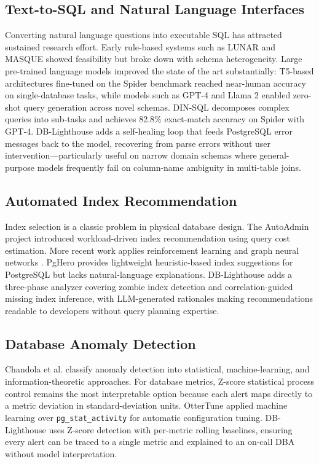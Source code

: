\documentclass[conference]{IEEEtran}
\begin{document}
\subsection{Text-to-SQL and Natural Language Interfaces}

Converting natural language questions into executable SQL has attracted
sustained research effort. Early rule-based systems such as LUNAR
\cite{woods1973progress} and MASQUE \cite{androutsopoulos1995nldb} showed
feasibility but broke down with schema heterogeneity. Large pre-trained
language models improved the state of the art substantially: T5-based
architectures fine-tuned on the Spider benchmark \cite{yu2018spider}
reached near-human accuracy on single-database tasks, while models such
as GPT-4 \cite{openai2023gpt4} and Llama 2 \cite{touvron2023llama} enabled
zero-shot query generation across novel schemas. DIN-SQL \cite{pourreza2024din}
decomposes complex queries into sub-tasks and achieves 82.8\% exact-match
accuracy on Spider with GPT-4. DB-Lighthouse adds a self-healing loop that
feeds PostgreSQL error messages back to the model, recovering from parse
errors without user intervention---particularly useful on narrow domain
schemas where general-purpose models frequently fail on column-name
ambiguity in multi-table joins.

\subsection{Automated Index Recommendation}

Index selection is a classic problem in physical database design. The
AutoAdmin project \cite{chaudhuri1997autoadmin} introduced workload-driven
index recommendation using query cost estimation. More recent work applies
reinforcement learning and graph neural networks \cite{lan2020index,
basu2020weightedge}. PgHero \cite{pghero2022} provides lightweight
heuristic-based index suggestions for PostgreSQL but lacks natural-language
explanations. DB-Lighthouse adds a three-phase analyzer covering zombie
index detection and correlation-guided missing index inference, with
LLM-generated rationales making recommendations readable to developers
without query planning expertise.

\subsection{Database Anomaly Detection}

Chandola et al. \cite{chandola2009anomaly} classify anomaly detection into
statistical, machine-learning, and information-theoretic approaches. For
database metrics, Z-score statistical process control \cite{grubbs1969}
remains the most interpretable option because each alert maps directly to a
metric deviation in standard-deviation units. OtterTune \cite{van2017ottertune}
applied machine learning over \texttt{pg\_stat\_activity} for automatic
configuration tuning. DB-Lighthouse uses Z-score detection with per-metric
rolling baselines, ensuring every alert can be traced to a single metric
and explained to an on-call DBA without model interpretation.
\end{document}
